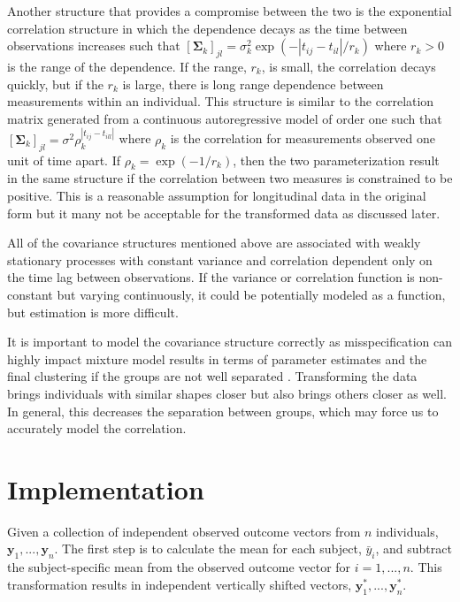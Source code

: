 \documentclass[12pt]{article}
\newcommand{\B}[0]{\mathbf}
\begin{document}
Another structure that provides a compromise between the two is the exponential correlation structure in which the dependence decays as the time between observations increases such that $[\B \Sigma_{k}]_{jl} = \sigma_{k}^{2}\exp(-| t_{ij}-t_{il}| / r_{k})$ where $r_{k}> 0$ is the range of the dependence. If the range, $r_{k}$, is small, the correlation decays quickly, but if the $r_{k}$ is large, there is long range dependence between measurements within an individual. This structure is similar to the correlation matrix generated from a continuous autoregressive model of order one such that $[\B\Sigma_{k}]_{jl} = \sigma^{2}\rho_{k}^{|t_{ij}-t_{ill}|}$ where $\rho_{k}$ is the correlation for measurements observed one unit of time apart. If $\rho_{k} = \exp(-1/r_{k})$, then the two parameterization result in the same structure if the correlation between two measures is constrained to be positive. This is a reasonable assumption for longitudinal data in the original form but it many not be acceptable for the transformed data as discussed later.

All of the covariance structures mentioned above are associated with weakly stationary processes with constant variance and correlation dependent only on the time lag between observations. If the variance or correlation function is non-constant but varying continuously, it could be potentially modeled as a function, but estimation is more difficult.

It is important to model the covariance structure correctly as misspecification can highly impact mixture model results in terms of parameter estimates and the final clustering if the groups are not well separated \cite{heggeseth2013}. Transforming the data brings individuals with similar shapes closer but also brings others closer as well. In general, this decreases the separation between groups, which may force us to accurately model the correlation. 

\section{Implementation}
Given a collection of independent observed outcome vectors from $n$ individuals, $\B y_{1},...,\B y_{n}$. The first step is to calculate the mean for each subject, $\bar{y}_{i}$,  and subtract the subject-specific mean from the observed outcome vector for $i=1,...,n$. This transformation results in independent vertically shifted vectors, $\B y^{*}_{1},...,\B y^{*}_{n}$.  
\end{document}
